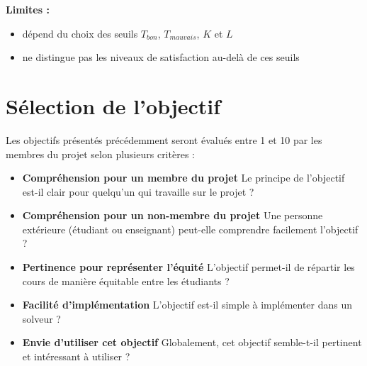 \documentclass[11pt]{article}
\begin{document}
\textbf{Limites :}

\begin{itemize}
\item dépend du choix des seuils $T_{bon}$, $T_{mauvais}$, $K$ et $L$
\item ne distingue pas les niveaux de satisfaction au-delà de ces seuils
\end{itemize}

\section{Sélection de l'objectif}

Les objectifs présentés précédemment seront évalués entre 1 et 10 par les membres du projet selon plusieurs critères :

\begin{itemize}

\item \textbf{Compréhension pour un membre du projet}
Le principe de l'objectif est-il clair pour quelqu'un qui travaille sur le projet ?

\item \textbf{Compréhension pour un non-membre du projet}
Une personne extérieure (étudiant ou enseignant) peut-elle comprendre facilement l'objectif ?

\item \textbf{Pertinence pour représenter l'équité}
L'objectif permet-il de répartir les cours de manière équitable entre les étudiants ?

\item \textbf{Facilité d'implémentation}
L'objectif est-il simple à implémenter dans un solveur ?

\item \textbf{Envie d'utiliser cet objectif}
Globalement, cet objectif semble-t-il pertinent et intéressant à utiliser ?

\end{itemize}
\end{document}
